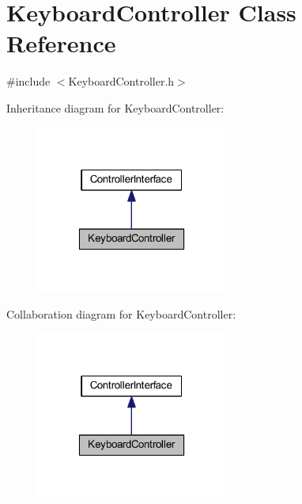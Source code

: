 \hypertarget{class_keyboard_controller}{
\section{KeyboardController Class Reference}
\label{d7/dd6/class_keyboard_controller}
}


{\ttfamily \#include $<$KeyboardController.h$>$}



Inheritance diagram for KeyboardController:
\nopagebreak
\begin{figure}[H]
\begin{center}
\leavevmode
\includegraphics[width=178pt]{dc/d98/class_keyboard_controller__inherit__graph}
\end{center}
\end{figure}


Collaboration diagram for KeyboardController:
\nopagebreak
\begin{figure}[H]
\begin{center}
\leavevmode
\includegraphics[width=178pt]{d5/d04/class_keyboard_controller__coll__graph}
\end{center}
\end{figure}
